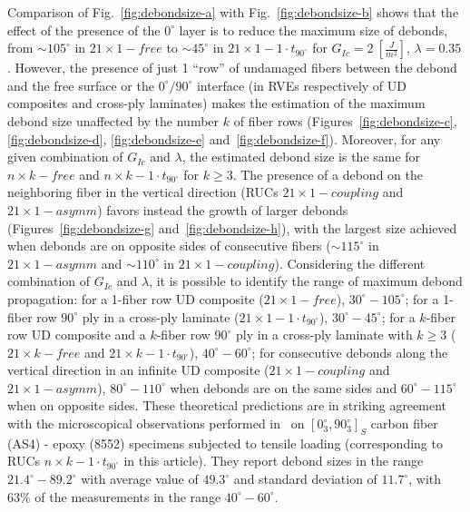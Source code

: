 \documentclass[12pt,a4paper]{article}
\begin{document}
Comparison of Fig.~\ref{fig:debondsize-a} with Fig.~\ref{fig:debondsize-b} shows that the effect of the presence of the $0^{\circ}$ layer is to reduce the maximum size of debonds, from $\sim105^{\circ}$ in $21\times 1-free$ to $\sim45^{\circ}$ in $21\times 1-1\cdot t_{90^{\circ}}$ for $G_{Ic}=2\ \left[\frac{J}{m^{2}}\right]$, $\lambda=0.35$. However, the presence of just 1 ``row'' of undamaged fibers between the debond and the free surface or the $0^{\circ}/90^{\circ}$ interface (in RVEs respectively of UD composites and cross-ply laminates) makes the estimation of the maximum debond size unaffected by the number $k$ of fiber rows (Figures~\ref{fig:debondsize-c}, \ref{fig:debondsize-d}, \ref{fig:debondsize-e} and~\ref{fig:debondsize-f}). Moreover, for any given combination of $G_{Ic}$ and $\lambda$, the estimated debond size is the same for $n\times k-free$ and $n\times k-1\cdot t_{90^{\circ}}$ for $k\geq3$. The presence of a debond on the neighboring fiber in the vertical direction (RUCs $21\times 1-coupling$ and $21\times 1-asymm$) favors instead the growth of larger debonds (Figures~\ref{fig:debondsize-g} and~\ref{fig:debondsize-h}), with the largest size achieved when debonds are on opposite sides of consecutive fibers ($\sim115^{\circ}$ in $21\times 1-asymm$ and $\sim110^{\circ}$ in $21\times 1-coupling$). Considering the different combination of $G_{Ic}$ and $\lambda$, it is possible to identify the range of maximum debond propagation: for a 1-fiber row UD composite ($21\times 1-free$), $30^{\circ}-105^{\circ}$; for a 1-fiber row $90^{\circ}$ ply in a cross-ply laminate ($21\times 1-1\cdot t_{90^{\circ}}$), $30^{\circ}-45^{\circ}$; for a $k$-fiber row UD composite and a $k$-fiber row $90^{\circ}$ ply in a cross-ply laminate with $k\geq3$ ($21\times k-free$ and $21\times k-1\cdot t_{90^{\circ}}$), $40^{\circ}-60^{\circ}$; for consecutive debonds along the vertical direction in an infinite UD composite ($21\times 1-coupling$ and $21\times 1-asymm$), $80^{\circ}-110^{\circ}$ when debonds are on the same sides and $60^{\circ}-115^{\circ}$ when on opposite sides. These theoretical predictions are in striking agreement with the microscopical observations performed in~\cite{Correa2018} on $\left[0^{\circ}_{3},90^{\circ}_{3}\right]_{S}$ carbon fiber (AS4) - epoxy (8552) specimens subjected to tensile loading (corresponding to RUCs $n\times k-1\cdot t_{90^{\circ}}$ in this article). They report debond sizes in the range $21.4^{\circ}-89.2^{\circ}$ with average value of $49.3^{\circ}$ and standard deviation of $11.7^{\circ}$, with $63\%$ of the measurements in the range $40^{\circ}-60^{\circ}$.
\end{document}
